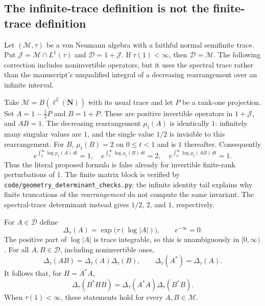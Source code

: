 \subsection{The infinite-trace definition is not the finite-trace definition}
Let $(\mathcal M,\tau)$ be a von Neumann algebra with a faithful normal
semifinite trace. Put $\mathcal J=\mathcal M\cap L^1(\tau)$ and
$\mathcal D=1+\mathcal J$. If $\tau(1)<\infty$, then
$\mathcal D=\mathcal M$. The following correction includes noninvertible
operators, but it uses the spectral trace rather than the manuscript's
unqualified integral of a decreasing rearrangement over an infinite interval.

\begin{example}
\label{geo-H-rearrangement}
Take $\mathcal M=B(\ell^2(\mathbf N))$ with its usual trace and let $P$ be
a rank-one projection. Set $A=1-\tfrac12P$ and $B=1+P$. These are positive
invertible operators in $1+\mathcal J$, and $AB=1$. The decreasing
rearrangement $\mu_t(A)$ is identically $1$: infinitely many singular values
are $1$, and the single value $1/2$ is invisible to this rearrangement.
For $B$, $\mu_t(B)=2$ on $0\leq t<1$ and is $1$ thereafter. Consequently
\[
 e^{\int_0^\infty\log\mu_t(A)\,dt}=1,\quad
 e^{\int_0^\infty\log\mu_t(B)\,dt}=2,\quad
 e^{\int_0^\infty\log\mu_t(AB)\,dt}=1.
\]
Thus the literal proposed formula is false already for invertible
finite-rank perturbations of $1$. The finite matrix block is verified by
\texttt{code/geometry\_determinant\_checks.py}; the infinite identity tail
explains why finite truncations of the \emph{rearrangement} do not compute the
same invariant. The spectral-trace determinant instead gives $1/2$, $2$,
and $1$, respectively.
\end{example}

\begin{theorem}
\label{geo-H-determinant}
For $A\in\mathcal D$ define
\[
 \Delta_\tau(A)=\exp\bigl(\tau(\log|A|)\bigr),\qquad e^{-\infty}=0.
\]
The positive part of $\log|A|$ is trace integrable, so this is unambiguously
in $[0,\infty)$. For all $A,B\in\mathcal D$, including noninvertible ones,
\[
 \Delta_\tau(AB)=\Delta_\tau(A)\Delta_\tau(B),\qquad
 \Delta_\tau(A^*)=\Delta_\tau(A).
\]
It follows that, for $H=A^*A$,
\[
 \Delta_\tau(B^*HB)
 =\Delta_\tau(A^*A)\Delta_\tau(B^*B).
\]
When $\tau(1)<\infty$, these statements hold for every $A,B\in\mathcal M$.
\end{theorem}


